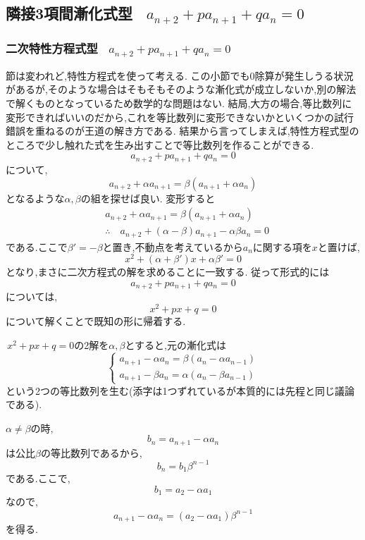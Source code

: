 
\subsection{隣接3項間漸化式型 \, $\displaystyle a_{n+2}+pa_{n+1}+qa_n=0$}
  \subsubsection{二次特性方程式型 \, $\displaystyle a_{n+2}+pa_{n+1}+qa_n=0$}
    節は変われど,特性方程式を使って考える.
    この小節でも0除算が発生しうる状況があるが,そのような場合はそもそもそのような漸化式が成立しないか,別の解法で解くものとなっているため数学的な問題はない.
    結局,大方の場合,等比数列に変形できればいいのだから,これを等比数列に変形できないかといくつかの試行錯誤を重ねるのが王道の解き方である.
    結果から言ってしまえば,特性方程式型のところで少し触れた式を生み出すことで等比数列を作ることができる.
    \[
      a_{n+2}+pa_{n+1}+qa_n=0
    \]
    について,
    \[
      a_{n+2}+\alpha a_{n+1}=\beta(a_{n+1}+\alpha a_{n})
    \]
    となるような$\alpha,\beta$の組を探せば良い.
    変形すると
    \begin{align*}
      &a_{n+2}+\alpha a_{n+1}=\beta(a_{n+1}+\alpha a_{n})\\
      &\therefore \quad a_{n+2}+(\alpha-\beta)a_{n+1}-\alpha\beta a_n=0
    \end{align*}
    である.ここで$\beta'=-\beta$と置き,不動点を考えているから$a_n$に関する項を$x$と置けば,
    \[
      x^2+(\alpha+\beta')x+\alpha\beta'=0      
    \]
    となり,まさに二次方程式の解を求めることに一致する.
    従って形式的には
    \[
      a_{n+2}+pa_{n+1}+qa_n=0
    \]
    については,
    \[
      x^2+px+q=0
    \]
    について解くことで既知の形に帰着する.

    \,$x^2+px+q=0$の2解を$\alpha,\beta$とすると,元の漸化式は
    \[
      \begin{cases}
        a_{n+1}-\alpha a_n=\beta(a_n-\alpha a_{n-1})\\
        a_{n+1}-\beta a_n=\alpha(a_n-\beta a_{n-1})
      \end{cases}
    \]
    という2つの等比数列を生む(添字は1つずれているが本質的には先程と同じ議論である).

    $\alpha\ne\beta$の時,
    \[
      b_n=a_{n+1}-\alpha a_n
    \]
    は公比$\beta$の等比数列であるから,
    \[
      b_n=b_1\beta^{n-1}
    \]
    である.ここで,
    \[
      b_1=a_2-\alpha a_1
    \]
    なので,
    \[
      a_{n+1}-\alpha a_n
      =(a_2-\alpha a_1)\beta^{n-1}
    \]
    を得る.

